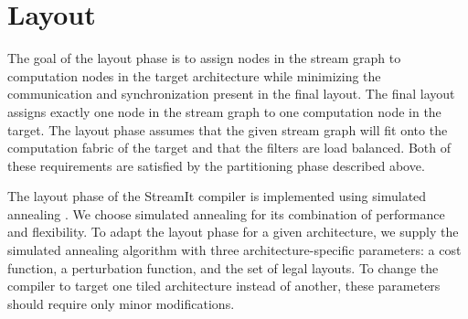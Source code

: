 \section{Layout}
\label{sec:layout}

The goal of the layout phase is to assign nodes in the stream graph to
computation nodes in the target architecture while minimizing the
communication and synchronization present in the final layout.  The
final layout assigns exactly one node in the stream graph to one
computation node in the target.  The layout phase assumes that the
given stream graph will fit onto the computation fabric of the target
and that the filters are load balanced.  Both of these requirements
are satisfied by the partitioning phase described above.



The layout phase of the StreamIt compiler is implemented using
simulated annealing \cite{simanneal}.  We choose simulated annealing
for its combination of performance and flexibility.  To adapt the
layout phase for a given architecture, we supply the simulated
annealing algorithm with three architecture-specific parameters: a
cost function, a perturbation function, and the set of legal layouts.
To change the compiler to target one tiled architecture instead of
another, these parameters should require only minor modifications.

